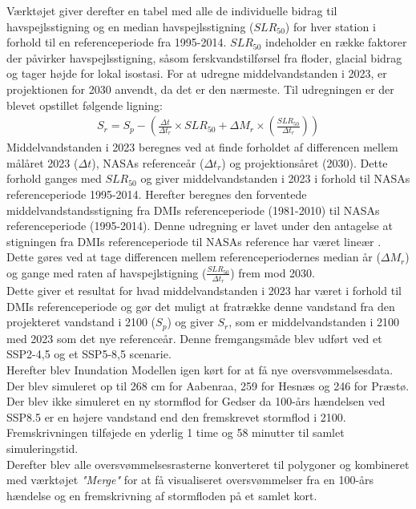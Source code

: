 Værktøjet giver derefter en tabel med alle de individuelle bidrag til havspejlsstigning og en median havspejlsstigning ($SLR_{50}$) for hver station i forhold til en referenceperiode fra 1995-2014. $SLR_{50}$ indeholder en række faktorer der påvirker havspejlsstigning, såsom ferskvandstilførsel fra floder, glacial bidrag og tager højde for lokal isostasi. For at udregne middelvandstanden i 2023, er projektionen for 2030 anvendt, da det er den nærmeste. Til udregningen er der blevet opstillet følgende ligning: 
\begin{align} \label{Equation: Vandstandsstigning calculation}
    S_r = S_p- \left( \frac{\Delta{t}}{\Delta{t_r}}\times SLR_{50} + \Delta{M_r} \times \left(\frac{SLR_{50}}{\Delta{t_r}}\right) \right)
\end{align}
Middelvandstanden i 2023 beregnes ved at finde forholdet af differencen mellem målåret 2023 ($\Delta{t}$), NASAs referenceår ($\Delta{t_r}$) og projektionsåret (2030). Dette forhold ganges med $SLR_{50}$ og giver middelvandstanden i 2023 i forhold til NASAs referenceperiode 1995-2014. Herefter beregnes den forventede middelvandstandsstigning fra DMIs referenceperiode (1981-2010) til NASAs referenceperiode (1995-2014). Denne udregning er lavet under den antagelse at stigningen fra DMIs referenceperiode til NASAs reference har været lineær \citep{danish_meteorological_institute_dmi_2024}. Dette gøres ved at tage differencen mellem referenceperiodernes median år ($\Delta{M_r}$) og gange med raten af havspejlstigning ($\frac{SLR_{50}}{\Delta{t_r}}$) frem mod 2030. \\
Dette giver et resultat for hvad middelvandstanden i 2023 har været i forhold til DMIs referenceperiode og gør det muligt at fratrække denne vandstand fra den projekteret vandstand i 2100 ($S_p$) og giver $S_r$, som er middelvandstanden i 2100 med 2023 som det nye referenceår. Denne fremgangsmåde blev udført ved et SSP2-4,5 og et SSP5-8,5 scenarie.\\

Herefter blev Inundation Modellen igen kørt for at få nye oversvømmelsesdata. Der blev simuleret op til 268 cm for Aabenraa, 259 for Hesnæs og 246 for Præstø. Der blev ikke simuleret en ny stormflod for Gedser da 100-års hændelsen ved SSP8.5 er en højere vandstand end den fremskrevet stormflod i 2100. Fremskrivningen tilføjede en yderlig 1 time og 58 minutter til samlet simuleringstid.\\

Derefter blev alle oversvømmelsesrasterne konverteret til polygoner og kombineret med værktøjet \textit{"Merge"} for at få visualiseret oversvømmelser fra en 100-års hændelse og en fremskrivning af stormfloden på et samlet kort.